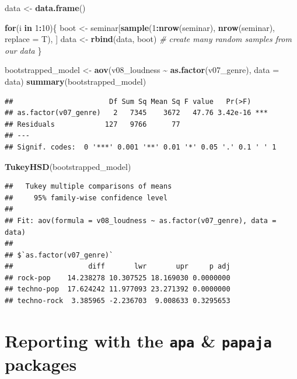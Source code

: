 \documentclass[
]{book}
\newenvironment{Shaded}{\begin{snugshade}}{\end{snugshade}}
\newcommand{\AttributeTok}[1]{\textcolor[rgb]{0.13,0.29,0.53}{#1}}
\newcommand{\CommentTok}[1]{\textcolor[rgb]{0.56,0.35,0.01}{\textit{#1}}}
\newcommand{\ControlFlowTok}[1]{\textcolor[rgb]{0.13,0.29,0.53}{\textbf{#1}}}
\newcommand{\DecValTok}[1]{\textcolor[rgb]{0.00,0.00,0.81}{#1}}
\newcommand{\FunctionTok}[1]{\textcolor[rgb]{0.13,0.29,0.53}{\textbf{#1}}}
\newcommand{\NormalTok}[1]{#1}
\newcommand{\OtherTok}[1]{\textcolor[rgb]{0.56,0.35,0.01}{#1}}
\newcommand{\SpecialCharTok}[1]{\textcolor[rgb]{0.81,0.36,0.00}{\textbf{#1}}}
\begin{document}
\begin{Shaded}
\begin{Highlighting}[]
\NormalTok{data }\OtherTok{\textless{}{-}} \FunctionTok{data.frame}\NormalTok{()}

\ControlFlowTok{for}\NormalTok{(i }\ControlFlowTok{in} \DecValTok{1}\SpecialCharTok{:}\DecValTok{10}\NormalTok{)\{}
\NormalTok{  boot }\OtherTok{\textless{}{-}}\NormalTok{ seminar[}\FunctionTok{sample}\NormalTok{(}\DecValTok{1}\SpecialCharTok{:}\FunctionTok{nrow}\NormalTok{(seminar), }\FunctionTok{nrow}\NormalTok{(seminar), }\AttributeTok{replace =}\NormalTok{ T), ]}
\NormalTok{  data }\OtherTok{\textless{}{-}} \FunctionTok{rbind}\NormalTok{(data, boot) }\CommentTok{\# create many random samples from our data }
\NormalTok{\}}

\NormalTok{bootstrapped\_model }\OtherTok{\textless{}{-}} \FunctionTok{aov}\NormalTok{(v08\_loudness }\SpecialCharTok{\textasciitilde{}} \FunctionTok{as.factor}\NormalTok{(v07\_genre), }\AttributeTok{data =}\NormalTok{ data)}
\FunctionTok{summary}\NormalTok{(bootstrapped\_model)}
\end{Highlighting}
\end{Shaded}

\begin{verbatim}
##                       Df Sum Sq Mean Sq F value   Pr(>F)    
## as.factor(v07_genre)   2   7345    3672   47.76 3.42e-16 ***
## Residuals            127   9766      77                     
## ---
## Signif. codes:  0 '***' 0.001 '**' 0.01 '*' 0.05 '.' 0.1 ' ' 1
\end{verbatim}

\begin{Shaded}
\begin{Highlighting}[]
\FunctionTok{TukeyHSD}\NormalTok{(bootstrapped\_model)}
\end{Highlighting}
\end{Shaded}

\begin{verbatim}
##   Tukey multiple comparisons of means
##     95% family-wise confidence level
## 
## Fit: aov(formula = v08_loudness ~ as.factor(v07_genre), data = data)
## 
## $`as.factor(v07_genre)`
##                  diff       lwr       upr     p adj
## rock-pop    14.238278 10.307525 18.169030 0.0000000
## techno-pop  17.624242 11.977093 23.271392 0.0000000
## techno-rock  3.385965 -2.236703  9.008633 0.3295653
\end{verbatim}

\section{\texorpdfstring{Reporting with the \texttt{apa} \& \texttt{papaja} packages}{Reporting with the apa \& papaja packages}}\label{reporting-with-the-apa-papaja-packages}
\end{document}
